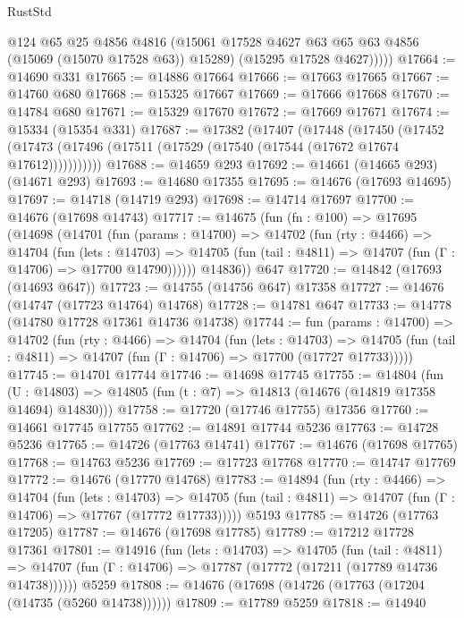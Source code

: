 \begin{lexlean}{RustStd}
\begin{coremodule}
            @124
            @65
            @25
            @4856
            @4816
            (@15061 @17528 @4627 @63 @65 @63 @4856 (@15069 (@15070 @17528 @63)) @15289)
            (@15295 @17528 @4627)))))
@17664 := @14690 @331
@17665 := @14886 @17664
@17666 := @17663 @17665
@17667 := @14760 @680
@17668 := @15325 @17667
@17669 := @17666 @17668
@17670 := @14784 @680
@17671 := @15329 @17670
@17672 := @17669 @17671
@17674 := @15334 (@15354 @331)
@17687 := @17382
    (@17407
      (@17448
        (@17450
          (@17452 (@17473 (@17496 (@17511 (@17529 (@17540 (@17544 (@17672 @17674 @17612)))))))))))
@17688 := @14659 @293
@17692 := @14661 (@14665 @293) (@14671 @293)
@17693 := @14680 @17355
@17695 := @14676 (@17693 @14695)
@17697 := @14718 (@14719 @293)
@17698 := @14714 @17697
@17700 := @14676 (@17698 @14743)
@17717 := @14675
    (fun (fn : @100) =>
    @17695
      (@14698
        (@14701
          (fun (params : @14700) =>
          @14702
            (fun (rty : @4466) =>
            @14704
              (fun (lets : @14703) =>
              @14705 (fun (tail : @4811) => @14707 (fun (Γ : @14706) => @17700 @14790))))))
        @14836))
    @647
@17720 := @14842 (@17693 (@14693 @647))
@17723 := @14755 (@14756 @647) @17358
@17727 := @14676 (@14747 (@17723 @14764) @14768)
@17728 := @14781 @647
@17733 := @14778 (@14780 @17728 @17361 @14736 @14738)
@17744 := fun (params : @14700) =>
  @14702
    (fun (rty : @4466) =>
    @14704
      (fun (lets : @14703) =>
      @14705 (fun (tail : @4811) => @14707 (fun (Γ : @14706) => @17700 (@17727 @17733)))))
@17745 := @14701 @17744
@17746 := @14698 @17745
@17755 := @14804
    (fun (U : @14803) => @14805 (fun (t : @7) => @14813 (@14676 (@14819 @17358 @14694) @14830)))
@17758 := @17720 (@17746 @17755) @17356
@17760 := @14661 @17745 @17755
@17762 := @14891 @17744 @5236
@17763 := @14728 @5236
@17765 := @14726 (@17763 @14741)
@17767 := @14676 (@17698 @17765)
@17768 := @14763 @5236
@17769 := @17723 @17768
@17770 := @14747 @17769
@17772 := @14676 (@17770 @14768)
@17783 := @14894
    (fun (rty : @4466) =>
    @14704
      (fun (lets : @14703) =>
      @14705 (fun (tail : @4811) => @14707 (fun (Γ : @14706) => @17767 (@17772 @17733)))))
    @5193
@17785 := @14726 (@17763 @17205)
@17787 := @14676 (@17698 @17785)
@17789 := @17212 @17728 @17361
@17801 := @14916
    (fun (lets : @14703) =>
    @14705
      (fun (tail : @4811) =>
      @14707 (fun (Γ : @14706) => @17787 (@17772 (@17211 (@17789 @14736 @14738))))))
    @5259
@17808 := @14676 (@17698 (@14726 (@17763 (@17204 (@14735 (@5260 @14738))))))
@17809 := @17789 @5259
@17818 := @14940

\end{coremodule}
\end{lexlean}
